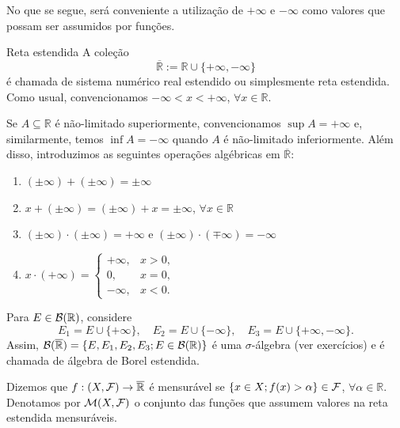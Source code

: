 
No que se segue, será conveniente a utilização de $+\infty$ e $-\infty$ como valores que possam ser assumidos por funções. 

\begin{definition*}{Reta estendida}
A coleção %
$$ \overline{\mathbb{R}} := \mathbb{R} \cup \{+\infty, -\infty\} $$ %
é chamada de sistema numérico real estendido 
ou simplesmente reta estendida. Como usual,
convencionamos $-\infty < x < +\infty$, $\forall x \in \mathbb{R}$. %
\end{definition*}

\noindent
Se $A \subseteq \mathbb{R}$ é não-limitado superiormente, convencionamos $\sup A = +\infty$ e, similarmente, temos $\inf A = -\infty$ quando $A$ é não-limitado inferiormente. Além disso, introduzimos as seguintes operações algébricas em $\overline{\mathbb{R}}$: %

\begin{enumerate}[label=\roman*)]
    \item $(\pm\infty) + (\pm\infty) = \pm\infty$ %
    \item $x + (\pm\infty) = (\pm\infty) + x = \pm\infty$, $\forall x \in \mathbb{R}$ 
    \item $(\pm\infty) \cdot (\pm\infty) = +\infty$ e $(\pm\infty) \cdot (\mp\infty) = -\infty$
    \item $x\cdot(+\infty) =
\begin{cases}
+\infty, & x>0,\\
0, & x=0,\\
-\infty, & x<0.
\end{cases}
$
\end{enumerate}
\bigline

\noindent
Para $E \in \mathcal{B}(\mathbb{R})$, considere
$$E_1 = E \cup \{+\infty\},\quad
E_2 = E \cup \{-\infty\},\quad E_3 = E \cup \{+\infty, -\infty\}.$$
Assim, $\mathcal{B}(\overline{\mathbb{R}}) = \{E, E_1, E_2, E_3 ; E \in \mathcal{B}(\mathbb{R})\}$ é uma $\sigma$-álgebra (ver exercícios)
e é chamada de álgebra de Borel estendida. %

\begin{definition*}{}
Dizemos que $f:(X,\mathcal{F}) \rightarrow \overline{\mathbb{R}}$ é mensurável se $\{x \in X; f(x) > \alpha\} \in \mathcal{F}$, $\forall \alpha \in \mathbb{R}$. %
Denotamos por $\mathcal{M}(X,\mathcal{F})$ o conjunto das funções
que assumem valores na reta estendida mensuráveis. %
\end{definition*}

